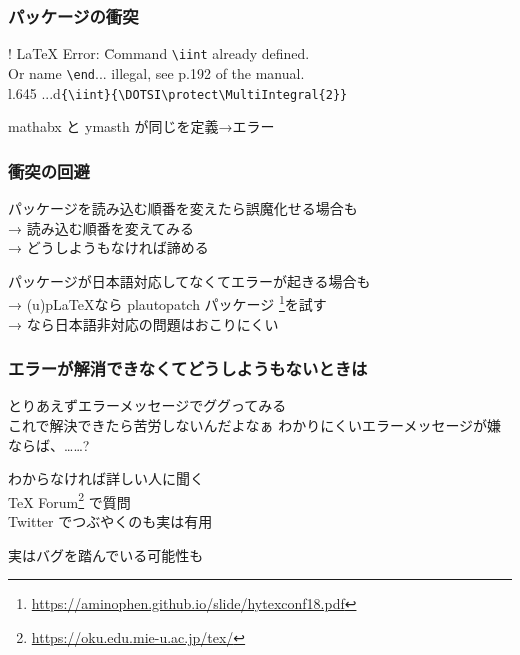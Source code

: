 \begin{frame}[fragile]
	\frametitle{パッケージの衝突}
	
	\vspace{-1ex}\vspace{-1ex}
	\bgroup\errorfont\scriptsize
	\begin{tabbing}
		! LaTeX Error: \=Command \verb+\iint+ already defined.\\
		\>Or name \verb+\end+... illegal, see p.192 of the manual.\\
		l.645 ...d\verb+{\iint}{\DOTSI\protect\MultiIntegral{2}}+\\
	\end{tabbing}
	\egroup \pause
	mathabx と ymasth が同じを定義→エラー
\end{frame}

\begin{frame}
	\frametitle{衝突の回避}
	パッケージを読み込む順番を変えたら誤魔化せる場合も\\
	→ 読み込む順番を変えてみる\\
	→ どうしようもなければ諦める
	
	パッケージが日本語対応してなくてエラーが起きる場合も\\
	→ (u)p\LaTeX なら plautopatch パッケージ
	\footnote{\url{https://aminophen.github.io/slide/hytexconf18.pdf}}を試す\\
	→ \LuaLaTeX なら日本語非対応の問題はおこりにくい
\end{frame}

\begin{frame}
	\frametitle{エラーが解消できなくてどうしようもないときは}
	とりあえずエラーメッセージでググってみる\\
	{\tiny これで解決できたら苦労しないんだよなぁ わかりにくいエラーメッセージが嫌ならば、\SATySFi ……?}
	
	わからなければ詳しい人に聞く\\
	{\footnotesize TeX Forum\footnote{\url{https://oku.edu.mie-u.ac.jp/tex/}} で質問\\
	Twitter でつぶやくのも実は有用}
	
	実はバグを踏んでいる可能性も
\end{frame}

